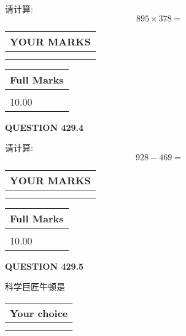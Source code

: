 \documentclass{ctexart}
\begin{document}
  
 
请计算:
\begin{equation}
895  \times    %
378 = \nonumber
\end{equation}
 

 

 
  
\vspace{0.2in}
  
\noindent\begin{tabular}{|l|}
\hline
 YOUR MARKS  \\
\hline
 \\ 
 \\ 
\hline
\end{tabular}
\hspace{0.05in} \begin{tabular}{|l|}
\hline
 Full Marks  \\
\hline
 \\ 
10.00 \\
\hline
\end{tabular}
{\textbf{\Large{QUESTION
429.4 
}}}
  
  
 
请计算:
\begin{equation}
928 -   %
469 = \nonumber
\end{equation}
 

 

 
  
\vspace{0.2in}
  
\noindent\begin{tabular}{|l|}
\hline
 YOUR MARKS  \\
\hline
 \\ 
 \\ 
\hline
\end{tabular}
\hspace{0.05in} \begin{tabular}{|l|}
\hline
 Full Marks  \\
\hline
 \\ 
10.00 \\
\hline
\end{tabular}
{\textbf{\Large{QUESTION
429.5 
}}}
  
  
科学巨匠牛顿是
  
  
\noindent\hspace{3.0in} \begin{tabular}{|l|}
\hline
Your choice \\
\hline
 \\ 
 \\ 
\hline
\end{tabular}
  
\end{document}
